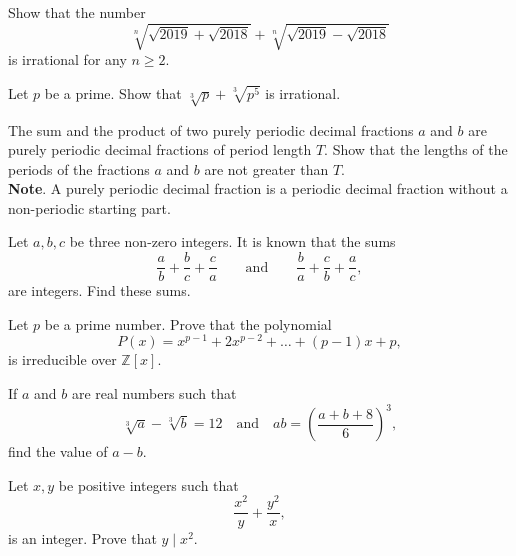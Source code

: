 \documentclass[12pt,a4paper]{memoir}
\theoremstyle{definition}
\begin{document}
\begin{question}[name={2018 Romanian District}]
	Show that the number
	\[\sqrt[n]{\sqrt{2019} + \sqrt{2018}} + \sqrt[n]{\sqrt{2019} - \sqrt{2018}}\]
	is irrational for any $n\ge 2$.
\end{question}


\begin{question}[name={2017 Thailand}]
	Let $p$ be a prime. Show that $\sqrt[3]{p} +\sqrt[3]{p^5} $ is irrational.
\end{question}


\begin{question}[name={2006 All--Russian}]
	The sum and the product of two purely periodic decimal fractions $a$ and $b$ are purely periodic decimal fractions of period length $T$. Show that the lengths of the periods of the fractions $a$ and $b$ are not greater than $T$.\\
	\textbf{Note}. A purely periodic decimal fraction is a periodic decimal fraction without a non-periodic starting part.
\end{question}  


\begin{question}[name={2006 Pan--African}]
	Let $a, b, c$ be three non-zero integers. It is known that the sums \[\frac{a}{b}+\frac{b}{c}+\frac{c}{a} \qquad \text{and} \qquad \frac{b}{a}+\frac{c}{b}+\frac{a}{c},\] are integers. Find these sums.
\end{question}


\begin{question}
	Let $p$ be a prime number. Prove that the polynomial
	\[P(x)=x^{p-1}+2x^{p-2}+\ldots+(p-1)x+p,\]
	is irreducible over $\mathbb Z[x]$.
\end{question}



\begin{question}
	If $a$ and $b$ are real numbers such that \[\sqrt[3]a-\sqrt[3]b=12 \quad \text{and} \quad ab=\left(\frac{a+b+8}6\right)^3,\] find the value of $a-b$.
\end{question}


\begin{question}[name={2014 Poland}]
	Let $x, y$ be positive integers such that \[\frac{x^2}{y}+\frac{y^2}{x},\] is an integer. Prove that $y\mid x^2$.
\end{question}
\end{document}
